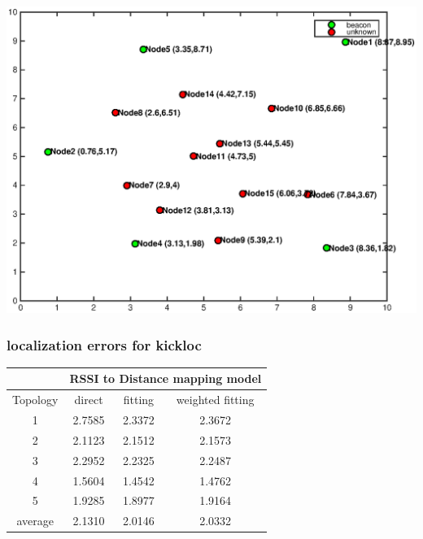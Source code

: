 \documentclass[11pt]{beamer}
\begin{document}
\begin{frame}
\includegraphics[width=\textwidth]{grass_topo1.eps} 
\end{frame}

\begin{frame}
\frametitle{localization errors for kickloc}

\begin{tabular}{|c|c|c|c|}
\hline 
 & \multicolumn{3}{c|}{RSSI to Distance mapping model} \\ 
\hline 
Topology & direct  & fitting & weighted fitting \\ 
\hline
1 & 2.7585 & 2.3372 & 2.3672 \\
\hline
2 & 2.1123 & 2.1512 & 2.1573  \\
\hline
3 & 2.2952 & 2.2325 & 2.2487  \\
\hline
4 & 1.5604 & 1.4542 & 1.4762  \\
\hline
5 & 1.9285 & 1.8977 & 1.9164  \\
\hline
average & 2.1310 & 2.0146 & 2.0332  \\
\hline 
\end{tabular} 
\end{frame}
\end{document}

